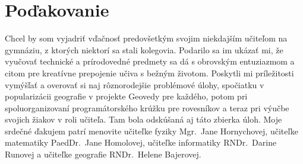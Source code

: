 \thispagestyle{empty}
\vspace*{\fill}
\section*{Poďakovanie}
Chcel by som vyjadriť vďačnosť predovšetkým svojim niekdajším učiteľom na gymnáziu, z ktorých niektorí sa stali kolegovia. Podarilo sa im ukázať mi, že vyučovať technické a prírodovedné predmety sa dá s obrovským entuziazmom a citom pre kreatívne prepojenie učiva s bežným životom. Poskytli mi príležitosti vymýšľať a overovať si naj rôznorodejšie problémové úlohy, spočiatku v popularizácii geografie v projekte Geovedy pre každého, potom pri spoluorganizovaní programátorského krúžku pre rovesníkov a teraz pri výučbe svojich žiakov v roli učiteľa. Tam bola odskúšaná aj táto zbierka úloh. Moje srdečné ďakujem patrí menovite učiteľke fyziky Mgr.~Jane Hornychovej, učiteľke matematiky PaedDr.~Jane Homolovej, učiteľke informatiky RNDr.~Darine Runovej a učiteľke geografie RNDr.~Helene Bajerovej.
\vspace{3cm}